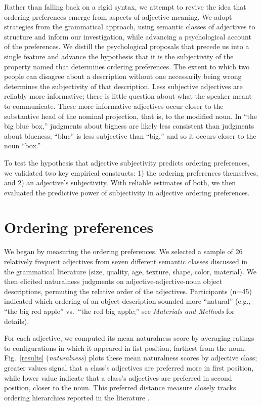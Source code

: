 \documentclass{pnastwo}
\begin{document}
\begin{article}
Rather than falling back on a rigid syntax, we attempt to revive the idea that ordering preferences emerge from aspects of adjective meaning. We adopt strategies from the grammatical approach, using semantic classes of adjectives to structure and inform our investigation, while advancing a psychological account of the preferences. We distill the psychological proposals that precede us into a single feature and advance the hypothesis that it is the subjectivity of the property named that determines ordering preferences.
 The extent to which two people can disagree about a description without one necessarily being wrong determines the subjectivity of that description.
 Less subjective adjectives are reliably more informative; there is little question about what the speaker meant to communicate. These more informative adjectives occur closer to the substantive head of the nominal projection, that is, to the modified noun.  In ``the big blue box,'' judgments about bigness are likely less consistent than judgments about blueness; ``blue'' is less subjective than ``big,'' and so it occurs closer to the noun ``box.''

To test the hypothesis that adjective subjectivity predicts ordering preferences, we validated two key empirical constructs: 1) the ordering preferences themselves, and 2) an adjective's subjectivity. With reliable estimates of both, we then evaluated the predictive power of subjectivity in adjective ordering preferences.

\section{Ordering preferences}

We began by measuring the ordering preferences. We selected a sample of 26 relatively frequent adjectives from seven different semantic classes discussed in the grammatical literature (size, quality, age, texture, shape, color, material). We then elicited naturalness judgments on adjective-adjective-noun object descriptions, permuting the relative order of the adjectives. Participants (n=45) indicated which ordering of an object description sounded more ``natural'' (e.g., ``the big red apple'' vs.\ ``the red big apple;'' see \emph{Materials and Methods} for details).

For each adjective, we computed its mean naturalness score by averaging ratings to configurations in which it appeared in fist position, farthest from the noun. Fig.\ \ref{results} (\emph{naturalness}) plots these mean naturalness scores by adjective class; greater values signal that a class's adjectives are preferred more in first position, while lower value indicate that a class's adjectives are preferred in second position, closer to the noun. This preferred distance measure closely tracks ordering hierarchies reported in the literature \cite{dixon1982,sproatshih1991}.


\end{article}
\end{document}
